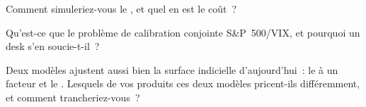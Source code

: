 \begin{interviewq}\label{iq:dv:rough-volatility-and-forward-variance-models:4}
Comment simuleriez-vous le , et quel en est le coût~?
\end{interviewq}

\begin{interviewq}\label{iq:dv:rough-volatility-and-forward-variance-models:5}
Qu'est-ce que le problème de calibration conjointe S\&P~500/VIX, et pourquoi un desk s'en soucie-t-il~?
\end{interviewq}

\begin{interviewq}\label{iq:dv:rough-volatility-and-forward-variance-models:6}
Deux modèles ajustent aussi bien la surface indicielle d'aujourd'hui~: le  à un facteur et le . Lesquels de vos produits
ces deux modèles pricent-ils différemment, et comment trancheriez-vous~?
\end{interviewq}
